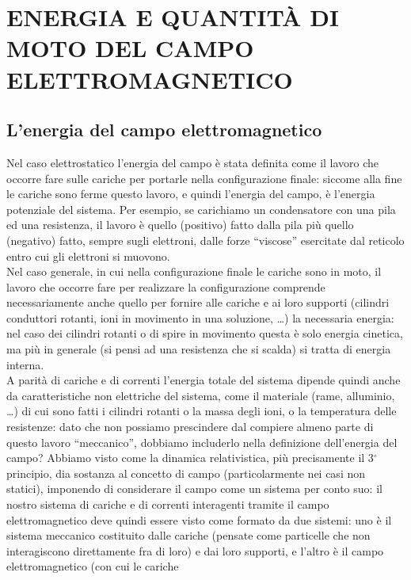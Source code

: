\section{ENERGIA E QUANTIT\`A DI MOTO DEL CAMPO ELETTROMAGNETICO}

\subsection{L'energia del campo elettromagnetico}

Nel caso elettrostatico l'energia del campo \`e stata definita come il lavoro
che occorre fare sulle cariche per portarle nella configurazione finale: siccome
alla fine le cariche sono ferme questo lavoro, e quindi l'energia del campo, \`e
l'energia potenziale del sistema. Per esempio, se carichiamo un condensatore con
una pila ed una resistenza, il lavoro \`e quello (positivo) fatto dalla pila
pi\`u quello (negativo) fatto, sempre sugli elettroni, dalle forze ``viscose''
esercitate dal reticolo entro cui gli elettroni si muovono.\\
Nel caso generale, in cui nella configurazione finale le cariche sono in moto,
il lavoro che occorre fare per realizzare la configurazione comprende
necessariamente anche quello per fornire alle cariche e ai loro supporti
(cilindri conduttori rotanti, ioni in movimento in una soluzione, \dots) la
necessaria energia: nel caso dei cilindri rotanti o di spire in movimento questa
\`e solo energia cinetica, ma pi\`u in generale (si pensi ad una resistenza che
si scalda) si tratta di energia interna.\\
A parit\`a di cariche e di correnti l'energia totale del sistema dipende quindi
anche da caratteristiche non elettriche del sistema, come il materiale (rame,
alluminio, \dots) di cui sono fatti i cilindri rotanti o la massa degli ioni, o
la temperatura delle resistenze: dato che non possiamo prescindere dal compiere
almeno parte di questo lavoro ``meccanico'', dobbiamo includerlo nella
definizione dell'energia del campo? Abbiamo visto come la dinamica
relativistica, pi\`u precisamente il 3$^\circ$ principio, dia sostanza al
concetto di campo (particolarmente nei casi non statici), imponendo di
considerare il campo come un sistema per conto suo: il nostro sistema di cariche
e di correnti interagenti tramite il campo elettromagnetico deve quindi essere
visto come formato da due sistemi: uno \`e il sistema meccanico costituito dalle
cariche (pensate come particelle che non interagiscono direttamente fra di loro)
e dai loro supporti, e l'altro \`e il campo elettromagnetico (con cui le cariche
